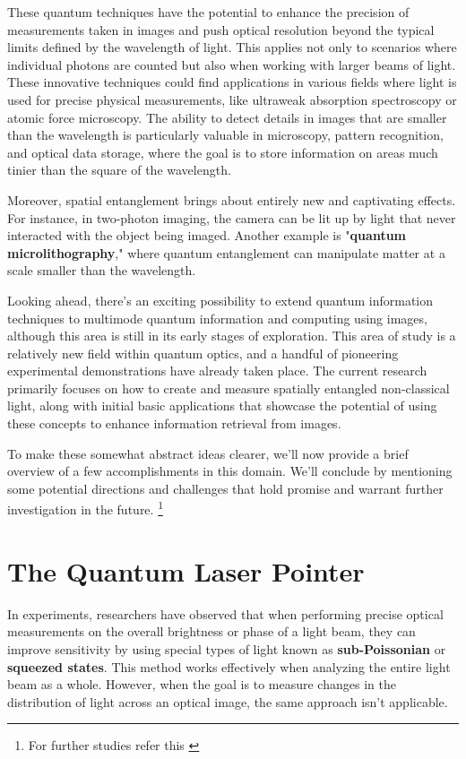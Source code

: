 \documentclass{article}
\begin{document}
These quantum techniques have the potential to enhance the precision of measurements taken in images and push optical resolution beyond the typical limits defined by the wavelength of light. This applies not only to scenarios where individual photons are counted but also when working with larger beams of light. These innovative techniques could find applications in various fields where light is used for precise physical measurements, like ultraweak absorption spectroscopy or atomic force microscopy. The ability to detect details in images that are smaller than the wavelength is particularly valuable in microscopy, pattern recognition, and optical data storage, where the goal is to store information on areas much tinier than the square of the wavelength.

Moreover, spatial entanglement brings about entirely new and captivating effects. For instance, in two-photon imaging, the camera can be lit up by light that never interacted with the object being imaged. Another example is "\textbf{quantum microlithography}," where quantum entanglement can manipulate matter at a scale smaller than the wavelength.

Looking ahead, there's an exciting possibility to extend quantum information techniques to multimode quantum information and computing using images, although this area is still in its early stages of exploration.
This area of study is a relatively new field within quantum optics, and a handful of pioneering experimental demonstrations have already taken place. The current research primarily focuses on how to create and measure spatially entangled non-classical light, along with initial basic applications that showcase the potential of using these concepts to enhance information retrieval from images.

To make these somewhat abstract ideas clearer, we'll now provide a brief overview of a few accomplishments in this domain. We'll conclude by mentioning some potential directions and challenges that hold promise and warrant further investigation in the future. \footnote{For further studies refer this \cite{kolobov1999}}

\section{The Quantum Laser Pointer}

In experiments, researchers have observed that when performing precise optical measurements on the overall brightness or phase of a light beam, they can improve sensitivity by using special types of light known as \textbf{sub-Poissonian} or \textbf{squeezed states}. This method works effectively when analyzing the entire light beam as a whole. However, when the goal is to measure changes in the distribution of light across an optical image, the same approach isn't applicable.
\end{document}
